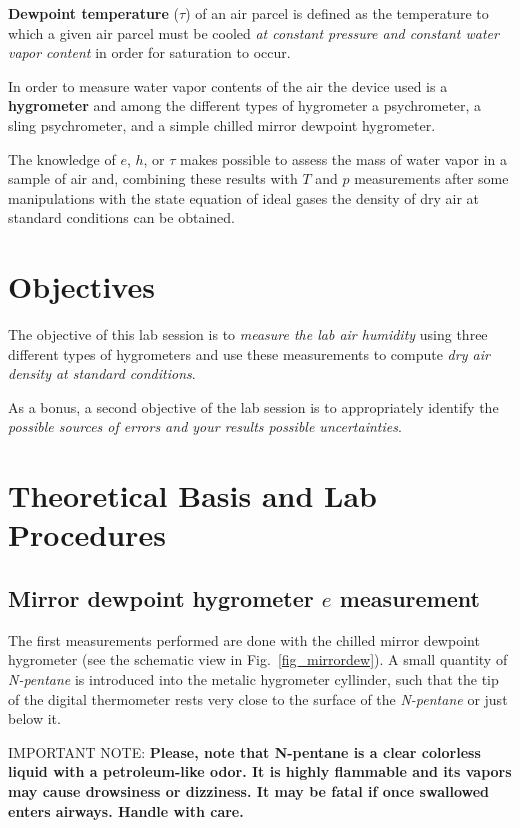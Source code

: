 \documentclass{article}
\begin{document}
\textbf{Dewpoint  temperature} ($\tau$)  of an  air  parcel is  defined as  the
temperature to  which a  given air parcel  must be cooled \textit{ at constant
pressure and constant  water vapor content} in order  for saturation to
occur.

In order to measure water vapor contents of the air the device used is
a \textbf{hygrometer} and among the different types of hygrometer a
psychrometer, a sling psychrometer, and a simple chilled mirror
dewpoint hygrometer.

The knowledge of $e$, $h$, or $\tau$ makes possible to assess the mass
of water vapor in a sample of air and, combining these results with
$T$ and $p$ measurements after some manipulations with the state
equation of ideal gases the density of dry air at standard conditions
can be obtained.
 


\section{Objectives}

The objective of this lab session is to \textit{measure the lab air
  humidity} using three different types of hygrometers and use these
measurements to compute \textit{dry air density at standard
  conditions}.

As a bonus, a second objective of the lab session is to appropriately identify the
\textit{possible sources of errors and your results possible uncertainties}. 


\section{Theoretical Basis and Lab Procedures}

\subsection{Mirror dewpoint hygrometer $e$ measurement}

The first measurements performed are done with the chilled mirror
dewpoint hygrometer (see the schematic view in Fig.\
\ref{fig_mirrordew}). A small quantity of \textit{N-pentane} is
introduced into the metalic hygrometer cyllinder, such that the tip of
the digital thermometer rests very close to the surface of the
\textit{N-pentane} or just below it.

\vspace{0.2cm}
IMPORTANT NOTE: \textbf{Please, note that N-pentane is a clear colorless liquid with a
  petroleum-like odor. It is highly flammable and its vapors may cause
  drowsiness or dizziness. It may be fatal if once swallowed enters
  airways. Handle with care.
}
\vspace{0.2cm}
\end{document}
